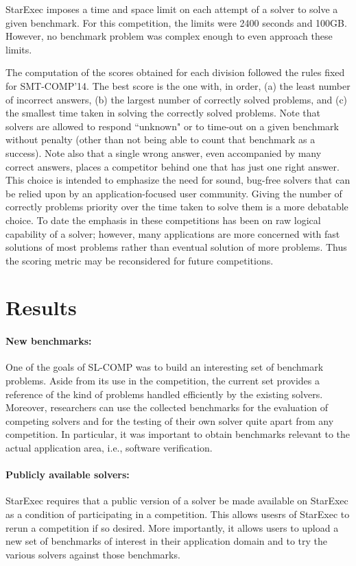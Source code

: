 \documentclass[twoside,11pt]{article}
\begin{document}
StarExec imposes a time and space limit on each attempt of a solver to solve a given benchmark. For this competition, the limits were 2400 seconds and 100GB. However, no benchmark problem was complex enough to even approach these limits.

The computation of the scores obtained for each division followed the rules fixed for SMT-COMP'14.
The best score is the one with, in order, (a) the least number of incorrect answers, (b) the largest number of correctly solved problems, and (c) the smallest time taken in solving the correctly solved problems.
Note that solvers are allowed to respond ``unknown" or to time-out on a given benchmark without penalty (other than not being able to count that benchmark as a success).
Note also that a single wrong answer, even accompanied by many correct answers, places a competitor behind one that has just one right answer. This choice is intended to emphasize the need for sound, bug-free solvers that can be relied upon by an application-focused user community. Giving the number of correctly problems priority over the time taken to solve them is a more debatable choice. To date the emphasis in these competitions has been on raw logical capability of a solver; however, many applications are more concerned with fast solutions of most problems rather than eventual solution of more problems. Thus the scoring metric may be reconsidered for future competitions.




\section{Results}

\paragraph{New benchmarks:}
One of the goals of SL-COMP was to build an interesting set of benchmark problems. 
Aside from its use in the competition, the current set provides a reference of the kind of problems handled efficiently by the existing solvers.
Moreover, researchers can use the collected benchmarks for the evaluation of competing solvers and for the testing of their own solver quite apart from any competition. 
In particular, it was important to obtain benchmarks relevant to the actual application area, i.e., software verification.

\paragraph{Publicly available solvers:} StarExec requires that a public version of a solver be made available on StarExec as a condition of participating in a competition. This allows usesrs of StarExec to rerun a competition if so desired. More importantly, it allows users to upload a new set of benchmarks of interest in their application domain and to try the various solvers against those benchmarks.
\end{document}

